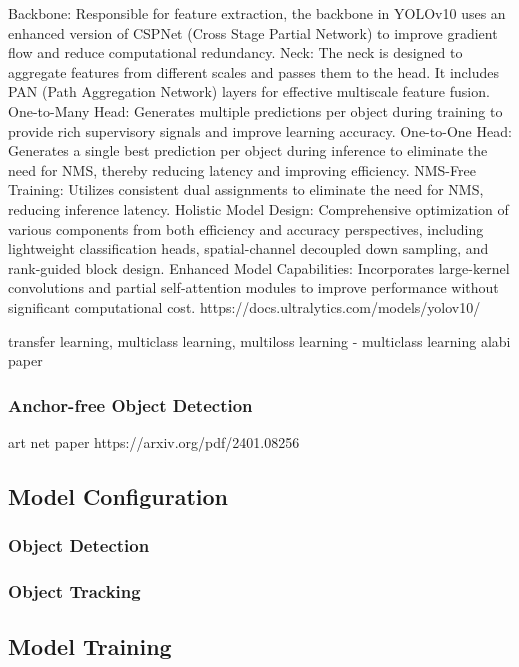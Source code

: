 Backbone: Responsible for feature extraction, the backbone in YOLOv10 uses an enhanced version of CSPNet (Cross Stage Partial Network) to improve gradient flow and reduce computational redundancy.
Neck: The neck is designed to aggregate features from different scales and passes them to the head. It includes PAN (Path Aggregation Network) layers for effective multiscale feature fusion.
One-to-Many Head: Generates multiple predictions per object during training to provide rich supervisory signals and improve learning accuracy.
One-to-One Head: Generates a single best prediction per object during inference to eliminate the need for NMS, thereby reducing latency and improving efficiency. 
NMS-Free Training: Utilizes consistent dual assignments to eliminate the need for NMS, reducing inference latency.
Holistic Model Design: Comprehensive optimization of various components from both efficiency and accuracy perspectives, including lightweight classification heads, spatial-channel decoupled down sampling, and rank-guided block design.
Enhanced Model Capabilities: Incorporates large-kernel convolutions and partial self-attention modules to improve performance without significant computational cost.
https://docs.ultralytics.com/models/yolov10/

transfer learning, multiclass learning, multiloss learning - multiclass learning alabi paper

\subsubsection{Anchor-free Object Detection}

art net paper	https://arxiv.org/pdf/2401.08256 

\subsection{Model Configuration}

\subsubsection{Object Detection}

\subsubsection{Object Tracking}

\subsection{Model Training}

